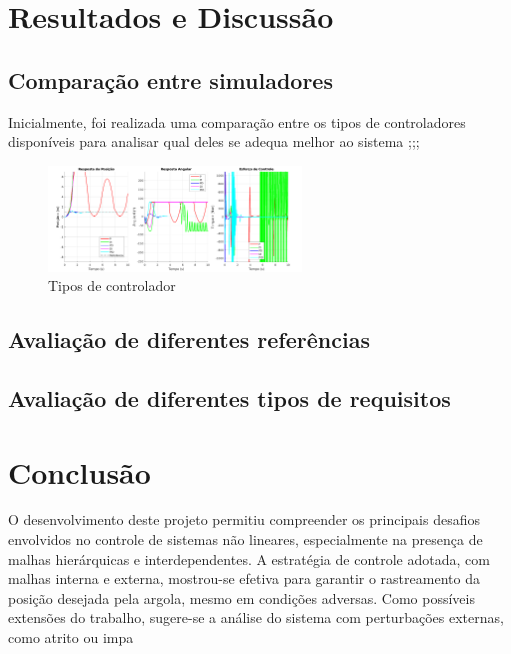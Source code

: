 \documentclass[a4paper, 12pt]{article}
\begin{document}
\section{Resultados e Discussão}

\subsection{Comparação entre simuladores}

Inicialmente, foi realizada uma comparação entre os tipos de controladores disponíveis para analisar qual deles se adequa melhor ao sistema ;;;

\begin{figure}[H]
    \centering
    \includegraphics[width=0.6\textwidth]{images/comparar-controlador.png}
    \caption{\centering Tipos de controlador}
    \label{fig:resultado-controladores}
\end{figure}

\subsection{Avaliação de diferentes referências}


\subsection{Avaliação de diferentes tipos de requisitos}


\section{Conclusão}
O desenvolvimento deste projeto permitiu compreender os principais desafios envolvidos no controle de sistemas não lineares, especialmente na presença de malhas hierárquicas e interdependentes. A estratégia de controle adotada, com malhas interna e externa, mostrou-se efetiva para garantir o rastreamento da posição desejada pela argola, mesmo em condições adversas. Como possíveis extensões do trabalho, sugere-se a análise do sistema com perturbações externas, como atrito ou impa
\end{document}
